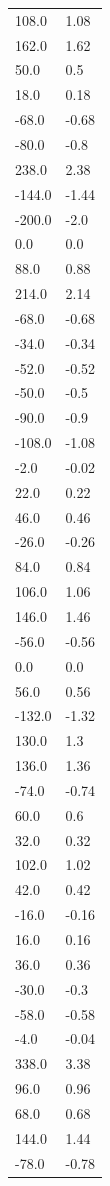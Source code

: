 \begin{longtable}{ll}
108.0 & 1.08 \\
162.0 & 1.62 \\
50.0 & 0.5 \\
18.0 & 0.18 \\
-68.0 & -0.68 \\
-80.0 & -0.8 \\
238.0 & 2.38 \\
-144.0 & -1.44 \\
-200.0 & -2.0 \\
0.0 & 0.0 \\
88.0 & 0.88 \\
214.0 & 2.14 \\
-68.0 & -0.68 \\
-34.0 & -0.34 \\
-52.0 & -0.52 \\
-50.0 & -0.5 \\
-90.0 & -0.9 \\
-108.0 & -1.08 \\
-2.0 & -0.02 \\
22.0 & 0.22 \\
46.0 & 0.46 \\
-26.0 & -0.26 \\
84.0 & 0.84 \\
106.0 & 1.06 \\
146.0 & 1.46 \\
-56.0 & -0.56 \\
0.0 & 0.0 \\
56.0 & 0.56 \\
-132.0 & -1.32 \\
130.0 & 1.3 \\
136.0 & 1.36 \\
-74.0 & -0.74 \\
60.0 & 0.6 \\
32.0 & 0.32 \\
102.0 & 1.02 \\
42.0 & 0.42 \\
-16.0 & -0.16 \\
16.0 & 0.16 \\
36.0 & 0.36 \\
-30.0 & -0.3 \\
-58.0 & -0.58 \\
-4.0 & -0.04 \\
338.0 & 3.38 \\
96.0 & 0.96 \\
68.0 & 0.68 \\
144.0 & 1.44 \\
-78.0 & -0.78 \\

\end{longtable}
